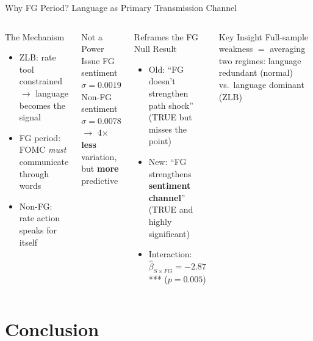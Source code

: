 \documentclass[aspectratio=169, 11pt]{beamer}
\begin{document}
\begin{frame}{Why FG Period? Language as Primary Transmission Channel}
\begin{columns}[T]
\begin{ablock}{The Mechanism}
\begin{itemize}
  \item ZLB: rate tool constrained $\to$ language becomes the signal
  \item FG period: FOMC \emph{must} communicate through words
  \item Non-FG: rate action speaks for itself
\end{itemize}
\end{ablock}
\vspace{0.3em}
\begin{aexampleblock}{Not a Power Issue}
FG sentiment $\sigma = 0.0019$ \\
Non-FG sentiment $\sigma = 0.0078$ \\
$\to$ 4$\times$ \textbf{less} variation, but \textbf{more} predictive
\end{aexampleblock}

\begin{ablock}{Reframes the FG Null Result}
\begin{itemize}
  \item Old: ``FG doesn't strengthen path shock'' (TRUE but misses the point)
  \item New: ``FG strengthens \textbf{sentiment channel}'' (TRUE and highly significant)
  \item Interaction: $\hat{\beta}_{S \times FG} = -2.87$*** ($p = 0.005$)
\end{itemize}
\end{ablock}
\vspace{0.3em}
\begin{aalertblock}{Key Insight}
Full-sample weakness $=$ averaging two regimes: language redundant (normal) vs.\ language dominant (ZLB)
\end{aalertblock}
\end{columns}
\end{frame}

\section{Conclusion}
\end{document}

